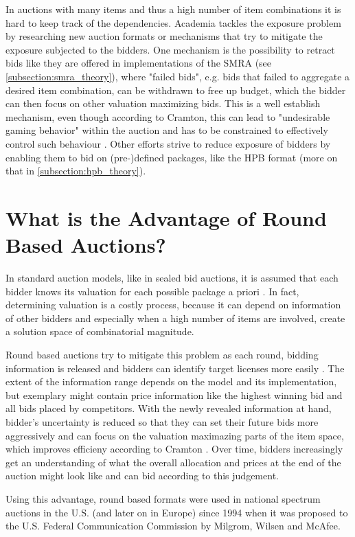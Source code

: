 In auctions with many items and thus a high number of item combinations it is hard to keep track of the dependencies. Academia tackles the exposure problem by researching new auction formats or mechanisms that try to mitigate the exposure subjected to the bidders. One mechanism is the possibility to retract bids like they are offered in implementations of the SMRA %
(see \autoref{subsection:smra_theory}), where "failed bids", e.g. bids that failed to aggregate a desired item combination, can be withdrawn to free up budget, which the bidder can then focus on other valuation maximizing bids. This is a well establish mechanism, even though according to Cramton, this can lead to "undesirable gaming behavior" within the auction and has to be constrained to effectively control such behaviour \cite{Cramton2006}.
Other efforts strive to reduce exposure of bidders by enabling them to bid on (pre-)defined packages, like the HPB format (more on that in \autoref{subsection:hpb_theory}). 

\section{What is the Advantage of Round Based Auctions?}
In standard auction models, like in sealed bid auctions, it is assumed that each bidder knows its valuation for each possible package a priori \cite{Cramton2006}. In fact, determining valuation is a costly process, because it can depend on information of other bidders and especially when a high number of items are involved, create a solution space of combinatorial magnitude. 

Round based auctions try to mitigate this problem as each round, bidding information is released and bidders can identify target licenses more easily \cite{Levin2009}. The extent of the information range depends on the model and its implementation, but exemplary might contain price information like the highest winning bid and all bids placed by competitors. With the newly revealed information at hand, bidder's uncertainty is reduced so that they can set their future bids more aggressively and can focus on the valuation maximazing parts of the item space, which improves efficieny according to Cramton \cite{Cramton2006}. Over time, bidders increasingly get an understanding of what the overall allocation and prices at the end of the auction might look like and can bid according to this judgement.

Using this advantage, round based formats were used in national spectrum auctions in the U.S. (and later on in Europe) since 1994 when it was proposed to the U.S. Federal Communication Commission by Milgrom, Wilsen and McAfee.

